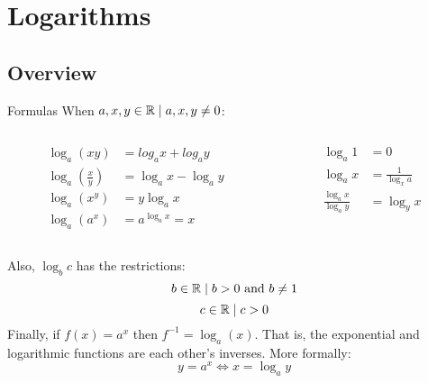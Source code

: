 \section{Logarithms}
\subsection{Overview}
\begin{namedframe}{Formulas}
	When $a, x, y \in \mathbb{R} \mid a, x, y \neq 0$:
	\begin{columns}
		\begin{column}{0.5\textwidth}
			\begin{align*}
				\log_a(xy)                       &= log_a x + log_a y\\
				\log_a\left( \frac{x}{y} \right) &= \log_a x - \log_a y\\
				\log_a(x^y)                      &= y \log_a x\\
				\log_a (a^x)                     &= a^{\log_a x} = x
			\end{align*}
		\end{column}
		\begin{column}{0.5\textwidth}
			\begin{align*}
				\log_a 1                  &= 0\\
				\log_a x                  &= \frac{1}{\log_x a}\\
				\frac{\log_a x}{\log_a y} &= \log_y x
			\end{align*}
		\end{column}
	\end{columns}
	\vsep
	Also, $\log_b c$ has the restrictions:
	\[b \in \mathbb{R} \mid b > 0 \text{ and } b \neq 1\]
	\[c \in \mathbb{R} \mid c > 0\]
	\pause
	Finally, if $f(x) = a^x$ then $f^{-1} = \log_a(x)$.
	That is, the exponential and logarithmic functions are each other's inverses.
	More formally:
	\[y = a^x \iff x = \log_a y\]
\end{namedframe}
